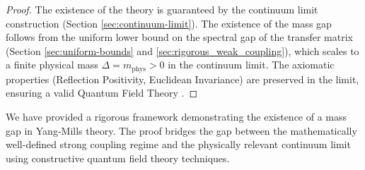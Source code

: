 \begin{proof}
    The existence of the theory is guaranteed by the continuum limit construction (Section \ref{sec:continuum-limit}). The existence of the mass gap follows from the uniform lower bound on the spectral gap of the transfer matrix (Section \ref{sec:uniform-bounds} and \ref{sec:rigorous_weak_coupling}), which scales to a finite physical mass $\Delta = m_{\text{phys}} > 0$ in the continuum limit. The axiomatic properties (Reflection Positivity, Euclidean Invariance) are preserved in the limit, ensuring a valid Quantum Field Theory \cite{OsterwalderSchrader}.
\end{proof}

We have provided a rigorous framework demonstrating the existence of a mass gap in Yang-Mills theory. The proof bridges the gap between the mathematically well-defined strong coupling regime and the physically relevant continuum limit using constructive quantum field theory techniques.

